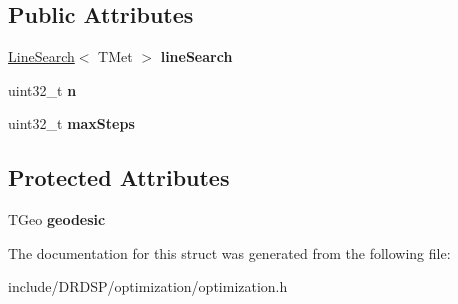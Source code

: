 \subsection*{Public Attributes}
\begin{DoxyCompactItemize}
\item 
\hypertarget{struct_d_r_d_s_p_1_1_optimization_a868b3e8e79ef495f081147505ab908be}{\hyperlink{struct_d_r_d_s_p_1_1_line_search}{Line\-Search}$<$ T\-Met $>$ {\bfseries line\-Search}}\label{struct_d_r_d_s_p_1_1_optimization_a868b3e8e79ef495f081147505ab908be}

\item 
\hypertarget{struct_d_r_d_s_p_1_1_optimization_a4b66199eaeee602f929cdf762ffce5ad}{uint32\-\_\-t {\bfseries n}}\label{struct_d_r_d_s_p_1_1_optimization_a4b66199eaeee602f929cdf762ffce5ad}

\item 
\hypertarget{struct_d_r_d_s_p_1_1_optimization_a7649b04369aa08774cb1dcb9ecbac98c}{uint32\-\_\-t {\bfseries max\-Steps}}\label{struct_d_r_d_s_p_1_1_optimization_a7649b04369aa08774cb1dcb9ecbac98c}

\end{DoxyCompactItemize}
\subsection*{Protected Attributes}
\begin{DoxyCompactItemize}
\item 
\hypertarget{struct_d_r_d_s_p_1_1_optimization_ac12c54ff1526af07708cfa1ca818c133}{T\-Geo {\bfseries geodesic}}\label{struct_d_r_d_s_p_1_1_optimization_ac12c54ff1526af07708cfa1ca818c133}

\end{DoxyCompactItemize}


The documentation for this struct was generated from the following file\-:\begin{DoxyCompactItemize}
\item 
include/\-D\-R\-D\-S\-P/optimization/optimization.\-h\end{DoxyCompactItemize}
